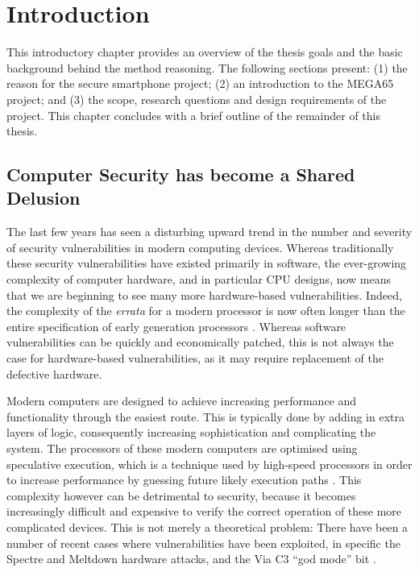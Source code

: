 
\chapter{Introduction} %

\label{Chapter1} %


This introductory chapter provides an overview of the thesis goals and the basic background behind the method reasoning. The following sections present: (1) the reason for the secure smartphone project; (2) an introduction to the MEGA65 project; and (3) the scope, research questions and design requirements of the project. This chapter concludes with a brief outline of the remainder of this thesis.

\section{Computer Security has become a Shared Delusion}

The last few years has seen a disturbing upward trend in the number and severity of security vulnerabilities in modern computing devices.
Whereas traditionally these security vulnerabilities have existed primarily in software, the ever-growing complexity of computer hardware, and in particular CPU designs, now means that we are beginning to see many more hardware-based vulnerabilities.
Indeed, the complexity of the {\em errata} for a modern processor is now often longer than the entire specification of early generation processors .
Whereas software vulnerabilities can be quickly and economically patched, this is not always the case for hardware-based vulnerabilities, as it may require replacement of the defective hardware.  

        Modern computers are designed to achieve increasing performance and functionality through the easiest route.
        This is typically done by adding in extra layers of logic, consequently increasing sophistication and complicating the system.
        The processors of these modern computers are optimised using speculative execution, which is a technique used by high-speed processors in order to increase performance by guessing future likely execution paths \cite{RN16}.
        This complexity however can be detrimental to security, because it becomes increasingly difficult and expensive to verify the correct operation of these more complicated devices.
        This is not merely a theoretical problem: There have been a number of recent cases where vulnerabilities have been exploited, in specific the Spectre and Meltdown hardware attacks, and the Via C3 ``god mode'' bit .

